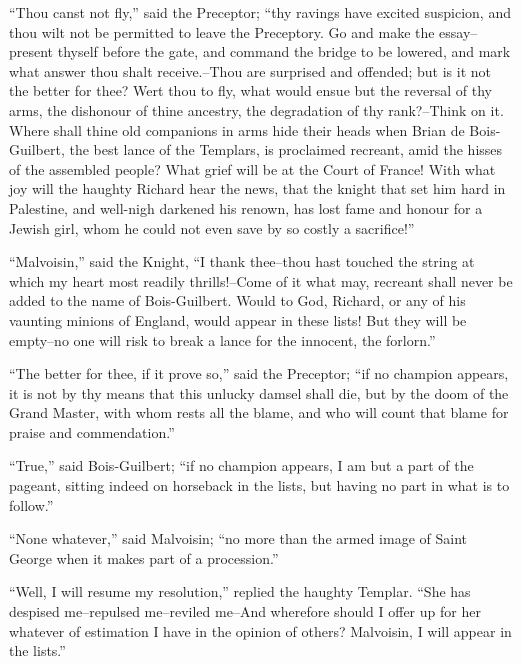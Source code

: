 ``Thou canst not fly,'' said the Preceptor; ``thy ravings have excited
suspicion, and thou wilt not be permitted to leave the Preceptory. Go
and make the essay--present thyself before the gate, and command the
bridge to be lowered, and mark what answer thou shalt receive.--Thou are
surprised and offended; but is it not the better for thee? Wert thou to
fly, what would ensue but the reversal of thy arms, the dishonour of
thine ancestry, the degradation of thy rank?--Think on it. Where shall
thine old companions in arms hide their heads when Brian de
Bois-Guilbert, the best lance of the Templars, is proclaimed recreant,
amid the hisses of the assembled people? What grief will be at the Court
of France! With what joy will the haughty Richard hear the news, that
the knight that set him hard in Palestine, and well-nigh darkened his
renown, has lost fame and honour for a Jewish girl, whom he could not
even save by so costly a sacrifice!''

``Malvoisin,'' said the Knight, ``I thank thee--thou hast touched the
string at which my heart most readily thrills!--Come of it what may,
recreant shall never be added to the name of Bois-Guilbert. Would to
God, Richard, or any of his vaunting minions of England, would appear in
these lists! But they will be empty--no one will risk to break a lance
for the innocent, the forlorn.''

``The better for thee, if it prove so,'' said the Preceptor; ``if no
champion appears, it is not by thy means that this unlucky damsel shall
die, but by the doom of the Grand Master, with whom rests all the blame,
and who will count that blame for praise and commendation.''

``True,'' said Bois-Guilbert; ``if no champion appears, I am but a part
of the pageant, sitting indeed on horseback in the lists, but having no
part in what is to follow.''

``None whatever,'' said Malvoisin; ``no more than the armed image of
Saint George when it makes part of a procession.''

``Well, I will resume my resolution,'' replied the haughty Templar.
``She has despised me--repulsed me--reviled me--And wherefore should I
offer up for her whatever of estimation I have in the opinion of others?
Malvoisin, I will appear in the lists.''

